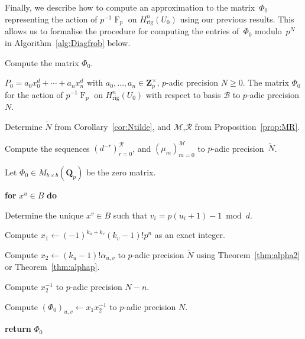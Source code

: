\documentclass[a4paper,11pt]{article}
\numberwithin{equation}{section}
\newcommand{\ZZ}{\mathbf{Z}} %
\newcommand{\QQ}{\mathbf{Q}} %
\DeclareMathOperator{\Frob}{F}           %
\providecommand{\Hrig}{H_{\text{rig}}}  %
\providecommand{\cB}{\mathcal{B}} %
\theoremstyle{definition}
\begin{document}
Finally, we describe how to compute an approximation to the matrix~$\Phi_0$ 
representing the action of $p^{-1} \Frob_p$ on $\Hrig^{n}(U_0)$ using our 
previous results. This allows us to formalise the procedure for computing 
the entries of~$\Phi_0$ modulo~$p^N$ in Algorithm~\ref{alg:Diagfrob} 
below.

\begin{algorithm}
\caption{Compute the matrix $\Phi_0$.}
\label{alg:Diagfrob}
\begin{algorithmic}
\vspace{1mm}
\Require $P_0=a_0 x_0^d + \dotsb + a_n x_n^d$ 
         with $a_0,\dotsc,a_n \in \ZZ_p^{\times}$, 
         $p$-adic precision $N \geq 0$.
\Ensure  The matrix $\Phi_0$ for the action of $p^{-1} \Frob_p$ 
         on $\Hrig^n(U_0)$ with respect to basis $\cB$ to $p$-adic 
         precision $N$.
\State \begin{compactenum}[{\hspace{1em}} 1.] \vspace{-1.24em}
\item Determine $\tilde{N}$ from Corollary~\ref{cor:Ntilde}, and 
      $\mathcal{M}$,$\mathcal{R}$ from Proposition~\ref{prop:MR}. 
\item Compute the sequences $(d^{-r})_{r=0}^{\mathcal{R}}$, and 
      $(\mu_{m})_{m=0}^{\mathcal{M}}$ to $p$-adic precision~$\tilde{N}$.
\item Let $\Phi_0 \in M_{b \times b}(\QQ_p)$ be the zero matrix.
\item[] \textbf{for} $x^u \in B$ \textbf{do} 
\item[] \begin{compactenum}[{\hspace{1em}} 1.]
        \item Determine the unique $x^v \in B$ such that $v_i = p (u_i + 1) - 1 \bmod{d}$.
        \item Compute $x_1 \gets (-1)^{k_u+k_v} (k_v-1)! p^n$ as an exact integer.
        \item Compute $x_2 \gets (k_u - 1)! \alpha_{u,v}$ to $p$-adic 
              precision $\tilde{N}$ using Theorem~\ref{thm:alpha2} or 
              Theorem~\ref{thm:alphap}.
        \item Compute $x_2^{-1}$ to $p$-adic precision $N-n$.
        \item Compute $(\Phi_0)_{u,v} \gets x_1 x_2^{-1}$ to $p$-adic precision $N$.
      \end{compactenum}   
 \item \textbf{return} $\Phi_0$      
\end{compactenum}
\EndProcedure
\end{algorithmic}
\end{algorithm}
\end{document}
